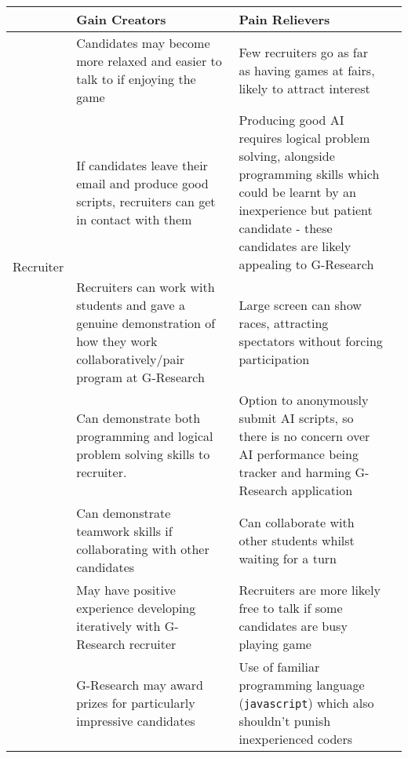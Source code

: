 \begin{tabularx}{\textwidth}{| c | X | X | X |}
\hline
& Gain Creators & Pain Relievers \\ 
\hline\hline
\multirow{4}{*}{Recruiter} 
	       & Candidates may become more relaxed and easier to talk to if enjoying the game
	       & Few recruiters go as far as having games at fairs, likely to attract interest \\ \cline{2-3}

	       & If candidates leave their email and produce good scripts, recruiters can get in contact with them
	       & Producing good AI requires logical problem solving, alongside programming skills which could be learnt by an inexperience but patient candidate - these candidates are likely appealing to G-Research\\ \cline{2-3}

	       & Recruiters can work with students and gave a genuine demonstration of how they work collaboratively/pair program at G-Research
	       & Large screen can show races, attracting spectators without forcing participation\\ 
\hline\hline
\multirow{4}{*}{Student} 
	       & Can demonstrate both programming and logical problem solving skills to recruiter.
	       & Option to anonymously submit AI scripts, so there is no concern over AI performance being tracker and harming G-Research application\\ \cline{2-3}

	       & Can demonstrate teamwork skills if collaborating with other candidates
	       & Can collaborate with other students whilst waiting for a turn\\ \cline{2-3}

	       & May have positive experience developing iteratively with G-Research recruiter
	       & Recruiters are more likely free to talk if some candidates are busy playing game\\ \cline{2-3}
	       
	       & G-Research may award prizes for particularly impressive candidates
	       & Use of familiar programming language ({\tt javascript}) which also shouldn't punish inexperienced coders\\ 
\hline
\end{tabularx}

